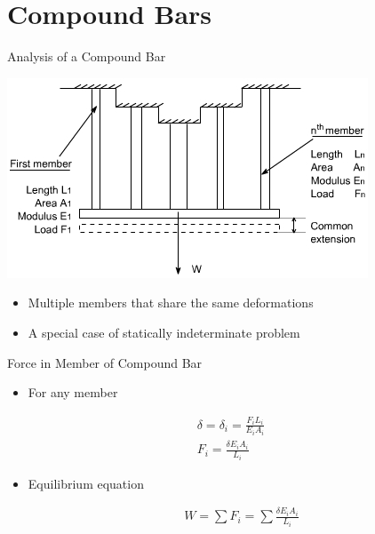 \documentclass[10pt, svgnames]{beamer}
\begin{document}
\section{Compound Bars}
\label{compound-bars}
\begin{frame}[label={sec:org3225bbf}]{Analysis of a Compound Bar}
\begin{center}
\includegraphics[width=.9\linewidth]{pictures/compound-bar.jpg}
\end{center}

\begin{itemize}
\item Multiple members that share the same deformations

\item A special case of statically indeterminate problem
\end{itemize}
\end{frame}

\begin{frame}[label={sec:orgf7291eb}]{Force in Member of Compound Bar}
\begin{itemize}
\item For any member
\end{itemize}

\begin{align*}
  \delta = \delta_i = \frac{F_i L_i}{E_i A_i} \\
  F_i = \frac{\delta E_i A_i}{L_i}
\end{align*}

\begin{itemize}
\item Equilibrium equation

\begin{align*}
  W = \sum F_i = \sum \frac{\delta E_i A_i}{L_i}
\end{align*}
\end{itemize}
\end{frame}
\end{document}
